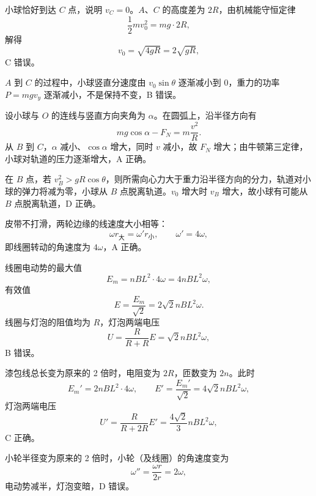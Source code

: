 \begin{answer}
小球恰好到达 $C$ 点，说明 $v_{C}=0$。$A$、$C$ 的高度差为 $2R$，由机械能守恒定律
\[
  \frac{1}{2}mv_{0}^{2}=mg\cdot2R,
\]
解得
\[
  v_{0}=\sqrt{4gR}=2\sqrt{gR},
\]
C 错误。

$A$ 到 $C$ 的过程中，小球竖直分速度由 $v_{0}\sin\theta$ 逐渐减小到 $0$，重力的功率 $P=mgv_{y}$ 逐渐减小，不是保持不变，B 错误。

设小球与 $O$ 的连线与竖直方向夹角为 $\alpha$。在圆弧上，沿半径方向有
\[
  mg\cos\alpha-F_{N}=m\frac{v^{2}}{R}.
\]
从 $B$ 到 $C$，$\alpha$ 减小、$\cos\alpha$ 增大，同时 $v$ 减小，故 $F_{N}$ 增大；由牛顿第三定律，小球对轨道的压力逐渐增大，A 正确。

在 $B$ 点，若 $v_{B}^{2}>gR\cos\theta$，则所需向心力大于重力沿半径方向的分力，轨道对小球的弹力将减为零，小球从 $B$ 点脱离轨道。$v_{0}$ 增大时 $v_{B}$ 增大，故小球有可能从 $B$ 点脱离轨道，D 正确。
\end{answer}

\begin{answer}
皮带不打滑，两轮边缘的线速度大小相等：
\[
  \omega r_{\text{大}}=\omega' r_{\text{小}},\qquad \omega'=4\omega,
\]
即线圈转动的角速度为 $4\omega$，A 正确。

线圈电动势的最大值
\[
  E_{m}=nBL^{2}\cdot4\omega=4nBL^{2}\omega,
\]
有效值
\[
  E=\frac{E_{m}}{\sqrt{2}}=2\sqrt{2}nBL^{2}\omega.
\]
线圈与灯泡的阻值均为 $R$，灯泡两端电压
\[
  U=\frac{R}{R+R}E=\sqrt{2}nBL^{2}\omega,
\]
B 错误。

漆包线总长变为原来的 2 倍时，电阻变为 $2R$，匝数变为 $2n$。此时
\[
  E_{m}'=2nBL^{2}\cdot4\omega,\qquad E'=\frac{E_{m}'}{\sqrt{2}}=4\sqrt{2}nBL^{2}\omega,
\]
灯泡两端电压
\[
  U'=\frac{R}{R+2R}E'=\frac{4\sqrt{2}}{3}nBL^{2}\omega,
\]
C 正确。

小轮半径变为原来的 2 倍时，小轮（及线圈）的角速度变为
\[
  \omega''=\frac{\omega r}{2r}=2\omega,
\]
电动势减半，灯泡变暗，D 错误。
\end{answer}

